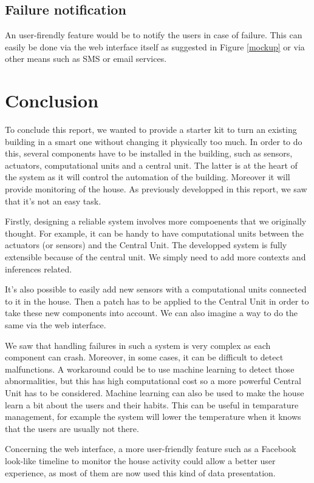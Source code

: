 \documentclass{acm_proc_article-sp}
\begin{document}
\subsection{Failure notification}
An user-firendly feature would be to notify the users in case of failure. This can easily be done via the web interface itself as suggested in Figure \ref{mockup} or via other means such as SMS or email services.

\section{Conclusion}
To conclude this report, we wanted to provide a starter kit to turn an existing building in a smart one without changing it physically too much. 
In order to do this, several components have to be installed in the building, such as sensors, actuators, computational units and a central unit. 
The latter is at the heart of the system as it will control the automation of the building. 
Moreover it will provide monitoring of the house. 
As previously developped in this report, we saw that it's not an easy task.

Firstly, designing a reliable system involves more compoenents that we originally thought. 
For example, it can be handy to have computational units between the actuators (or sensors) and the Central Unit. 
The developped system is fully extensible because of the central unit. We simply need to add more contexts and inferences related. 

It's also possible to easily add new sensors with a computational units connected to it in the house. 
Then a patch has to be applied to the Central Unit in order to take these new components into account. 
We can also imagine a way to do the same via the web interface. 

We saw that handling failures in such a system is very complex as each component can crash. 
Moreover, in some cases, it can be difficult to detect malfunctions. 
A workaround could be to use machine learning to detect those abnormalities, but this has high computational cost so a more powerful Central Unit has to be considered. 
Machine learning can also be used to make the house learn a bit about the users and their habits. 
This can be useful in temparature management, for example the system will lower the temperature when it knows that the users are usually not there. 

Concerning the web interface, a more user-friendly feature such as a Facebook look-like timeline to monitor the house activity could allow a better user experience, as most of them are now used this kind of data presentation. 



\nocite{*}

\end{document}
